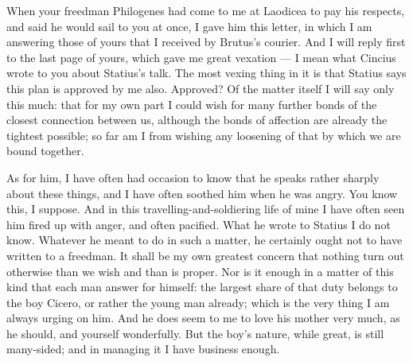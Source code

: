 

 When your freedman Philogenes had come to me at Laodicea to pay his respects, and said he would sail to you at once, I gave him this letter, in which I am answering those of yours that I received by Brutus's courier. And I will reply first to the last page of yours, which gave me great vexation --- I mean what Cincius wrote to you about Statius's talk. The most vexing thing in it is that Statius says this plan is approved by me also. Approved? Of the matter itself I will say only this much: that for my own part I could wish for many further bonds of the closest connection between us, although the bonds of affection are already the tightest possible; so far am I from wishing any loosening of that by which we are bound together.

 As for him, I have often had occasion to know that he speaks rather sharply about these things, and I have often soothed him when he was angry. You know this, I suppose. And in this travelling-and-soldiering life of mine I have often seen him fired up with anger, and often pacified. What he wrote to Statius I do not know. Whatever he meant to do in such a matter, he certainly ought not to have written to a freedman. It shall be my own greatest concern that nothing turn out otherwise than we wish and than is proper. Nor is it enough in a matter of this kind that each man answer for himself: the largest share of that duty belongs to the boy Cicero, or rather the young man already; which is the very thing I am always urging on him. And he does seem to me to love his mother very much, as he should, and yourself wonderfully. But the boy's nature, while great, is still many-sided; and in managing it I have business enough.

